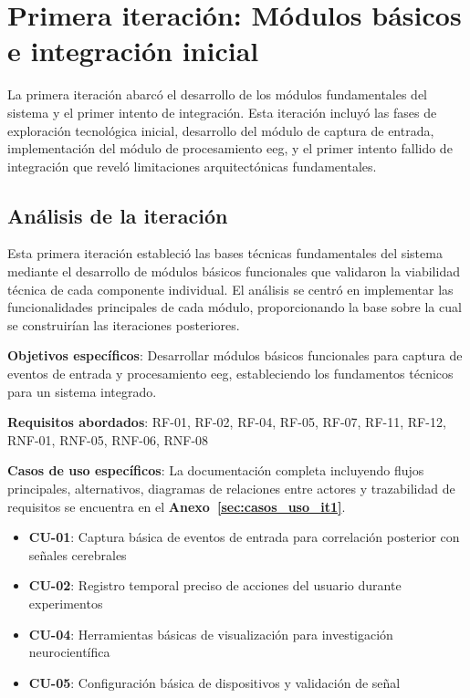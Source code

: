 \section{Primera iteración: Módulos básicos e integración inicial}
\label{sec:iteracion_1}

La primera iteración abarcó el desarrollo de los módulos fundamentales del sistema y el primer intento de integración. Esta iteración incluyó las fases de exploración tecnológica inicial, desarrollo del módulo de captura de entrada, implementación del módulo de procesamiento \acrshort{eeg}, y el primer intento fallido de integración que reveló limitaciones arquitectónicas fundamentales.

\subsection{Análisis de la iteración}
\label{subsec:analisis_iteracion_1}

Esta primera iteración estableció las bases técnicas fundamentales del sistema mediante el desarrollo de módulos básicos funcionales que validaron la viabilidad técnica de cada componente individual. El análisis se centró en implementar las funcionalidades principales de cada módulo, proporcionando la base sobre la cual se construirían las iteraciones posteriores.

\textbf{Objetivos específicos}: Desarrollar módulos básicos funcionales para captura de eventos de entrada y procesamiento \acrshort{eeg}, estableciendo los fundamentos técnicos para un sistema integrado.

\textbf{Requisitos abordados}: RF-01, RF-02, RF-04, RF-05, RF-07, RF-11, RF-12, RNF-01, RNF-05, RNF-06, RNF-08

\textbf{Casos de uso específicos}: La documentación completa incluyendo flujos principales, alternativos, diagramas de relaciones entre actores y trazabilidad de requisitos se encuentra en el \textbf{Anexo~\ref{sec:casos_uso_it1}}.
\begin{itemize}
    \item \textbf{CU-01}: Captura básica de eventos de entrada para correlación posterior con señales cerebrales
    \item \textbf{CU-02}: Registro temporal preciso de acciones del usuario durante experimentos
    \item \textbf{CU-04}: Herramientas básicas de visualización para investigación neurocientífica
    \item \textbf{CU-05}: Configuración básica de dispositivos y validación de señal
\end{itemize}

